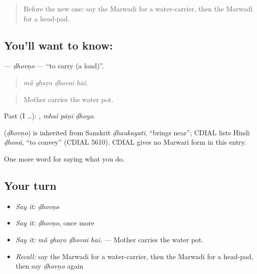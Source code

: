 \label{lesson:MW-C175-dhovno}



\begin{quote}
Before the new one: say the Marwadi for a water-carrier, then the Marwadi for a head-pad.
\end{quote}

\subsection*{You'll want to know: }
\textbf{} — \emph{ḍhovṇo} — \textquotedblleft{}to carry (a load)\textquotedblright{}.

\begin{quote}
   
\end{quote}

\begin{quote}
\emph{mā̃ ghaṛo ḍhovai hai.}
\end{quote}

\begin{quote}
Mother carries the water pot.
\end{quote}

Past (I …):   , \emph{mhaĩ pāṇī ḍhoyo}.

\begin{cousinweb}
\textbf{} (\emph{ḍhovṇo}) is inherited from Sanskrit \emph{ḍhaukayati}, \textquotedblleft{}brings near\textquotedblright{}; CDIAL lists Hindi \emph{ḍhonā}, \textquotedblleft{}to convey\textquotedblright{} (CDIAL 5610). CDIAL gives no Marwari form in this entry.
\end{cousinweb}

\begin{grammarlens}[title={What you've built}]
One more word for saying what you do.
\end{grammarlens}

\subsection*{Your turn}
\begin{itemize}
\raggedright
  \item \emph{Say it:} \emph{ḍhovṇo}
  \item \emph{Say it:} \emph{ḍhovṇo}, once more
  \item \emph{Say it:} \emph{mā̃ ghaṛo ḍhovai hai.} — Mother carries the water pot.
  \item \emph{Recall:} say the Marwadi for a water-carrier, then the Marwadi for a head-pad, then say \emph{ḍhovṇo} again
\end{itemize}

